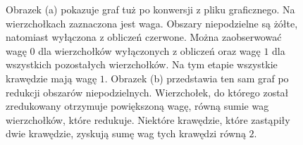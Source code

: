 \begin{figure}[h]
\centering
\begin{subfigure}{.5\textwidth}
    \centering
    \caption[short]{}
\end{subfigure}%
\begin{subfigure}{.5\textwidth}
    \centering
    \caption[short]{}
\end{subfigure}
\caption{Obrazek (a) pokazuje graf tuż po konwersji z pliku graficznego. Na wierzchołkach zaznaczona jest waga.
Obszary niepodzielne są żółte, natomiast wyłączona
z obliczeń czerwone. Można zaobserwować wagę $0$ dla wierzchołków wyłączonych z obliczeń oraz wagę $1$ dla wszystkich
pozostałych wierzchołków. Na tym etapie wszystkie krawędzie mają wagę $1$. Obrazek (b) przedstawia ten sam graf po redukcji obszarów
niepodzielnych. Wierzchołek, do którego został zredukowany otrzymuje powiększoną wagę, równą sumie wag wierzchołków, które
redukuje. Niektóre krawędzie, które zastąpiły dwie krawędzie, zyskują sumę wag tych krawędzi równą $2$.}
\label{im:indivisible}
\end{figure}

